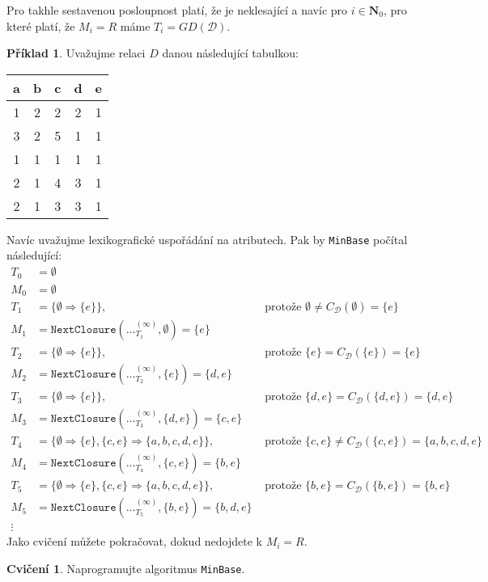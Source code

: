 \documentclass{article}
\theoremstyle {definition}
\newtheorem{example}{Příklad}
\newtheorem{exercise}{Cvičení}
\begin{document}
Pro takhle sestavenou posloupnost platí, že je neklesající a navíc pro
$i\in\mathbf N_0$, pro které platí, že $M_i=R$ máme
$T_i=GD(\mathcal D)$.

\begin{example}
  Uvažujme relaci $D$ danou následující tabulkou:

  \begin{center}
  \begin{tabular}{c c c c c}
    a & b & c & d & e \\
    \hline
    1 & 2 & 2 & 2 & 1 \\
    3 & 2 & 5 & 1 & 1 \\
    1 & 1 & 1 & 1 & 1 \\
    2 & 1 & 4 & 3 & 1 \\
    2 & 1 & 3 & 3 & 1 
  \end{tabular}
\end{center}
Navíc uvažujme lexikografické uspořádání na atributech. Pak by
\texttt{MinBase} počítal následující:
  \begin{align*}
    T_0&=\emptyset\\
    M_0&=\emptyset\\
    T_1&=\{\emptyset\Rightarrow \{e\}\},
       &\text{ protože } \emptyset\neq C_{\mathcal D}(\emptyset)=\{e\}\\
    M_1&=\texttt{NextClosure}(\dots_{T_1}^{(\infty)},\emptyset)=\{e\}\\
    T_2&=\{\emptyset\Rightarrow \{e\}\},
       &\text{ protože } \{e\} = C_{\mathcal D}(\{e\})=\{e\}\\
    M_2&=\texttt{NextClosure}(\dots_{T_2}^{(\infty)}, \{e\})=\{d,e\}\\
    T_3&=\{\emptyset\Rightarrow \{e\}\},
       &\text{ protože } \{d,e\} = C_{\mathcal D}(\{d,e\})=\{d,e\}\\
    M_3&=\texttt{NextClosure}(\dots_{T_3}^{(\infty)}, \{d,e\})=\{c,e\}\\
    T_4&=\{\emptyset\Rightarrow \{e\}, \{c,e\}\Rightarrow \{a,b,c,d,e\}\},
       &\text{ protože } \{c,e\} \neq C_{\mathcal D}(\{c,e\})=\{a,b,c,d,e\}\\
    M_4&=\texttt{NextClosure}(\dots_{T_4}^{(\infty)}, \{c,e\})=\{b,e\}\\
    T_5&=\{\emptyset\Rightarrow \{e\}, \{c,e\}\Rightarrow \{a,b,c,d,e\}\},
       &\text{ protože } \{b,e\} = C_{\mathcal D}(\{b,e\})=\{b,e\}\\
    M_5&=\texttt{NextClosure}(\dots_{T_5}^{(\infty)}, \{b,e\})=\{b,d,e\} \\
    \vdots
  \end{align*}
    Jako cvičení můžete pokračovat, dokud nedojdete k $M_i=R$.
\end{example}

\begin {exercise}
  Naprogramujte algoritmus \texttt {MinBase}.
\end {exercise}
\end{document}
